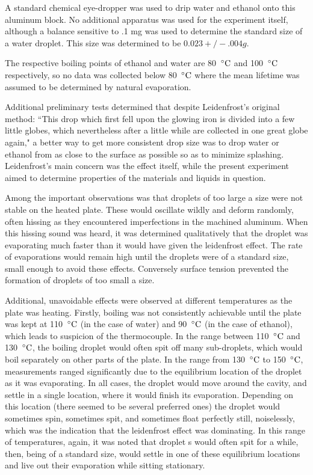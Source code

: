 \documentclass[aps,pre,twocolumn,nofootinbib]{revtex4}
\begin{document}
A standard chemical eye-dropper was used to drip water and ethanol onto this aluminum block.  No additional apparatus was used for the experiment itself, although a balance sensitive to .1 mg was used to determine the standard size of a water droplet.  This size was determined to be $0.023 +/- .004 g$.  

The respective boiling points of ethanol and water are 80 $\,^{\circ}{\rm C}$ and 100 $\,^{\circ}{\rm C}$ respectively, so no data was collected below 80 $\,^{\circ}{\rm C}$ where the mean lifetime was assumed to be determined by natural evaporation.  

Additional preliminary tests determined that despite Leidenfrost's original method: ``This drop which first fell upon the glowing iron is divided into a few little globes, which nevertheless after a little while are collected in one great globe again," \cite{original}a better way to get more consistent drop size was to drop water or ethanol from as close to the surface as possible so as to minimize splashing.  Leidenfrost's main concern was the effect itself, while the present experiment aimed to determine properties of the materials and liquids in question.  

Among the important observations was that droplets of too large a size were not stable on the heated plate.  These would oscillate wildly and deform randomly, often hissing as they encountered imperfections in the machined aluminum.  When this hissing sound was heard, it was determined qualitatively that the droplet was evaporating much faster than it would have given the leidenfrost effect.  The rate of evaporations would remain high until the droplets were of a standard size, small enough to avoid these effects.  Conversely surface tension prevented the formation of droplets of too small a size.  

Additional, unavoidable effects were observed at different temperatures as the plate was heating.  Firstly, boiling was not consistently achievable until the plate was kept at 110 $\,^{\circ}{\rm C}$ (in the case of water) and 90 $\,^{\circ}{\rm C}$ (in the case of ethanol), which leads to suspicion of the thermocouple.  In the range between 110 $\,^{\circ}{\rm C}$ and 130 $\,^{\circ}{\rm C}$, the boiling droplet would often spit off many sub-droplets, which would boil separately on other parts of the plate.  In the range from 130 $\,^{\circ}{\rm C}$ to 150 $\,^{\circ}{\rm C}$, measurements ranged significantly due to the equilibrium location of the droplet as it was evaporating.  In all cases, the droplet would move around the cavity, and settle in a single location, where it would finish its evaporation.  Depending on this location (there seemed to be several preferred ones) the droplet would sometimes spin, sometimes spit, and sometimes float perfectly still, noiselessly, which was the indication that the leidenfrost effect was dominating.  In this range of temperatures, again, it was noted that droplet s would often spit for a while, then, being of a standard size, would settle in one of these equilibrium locations and live out their evaporation while sitting stationary.  
\end{document}
